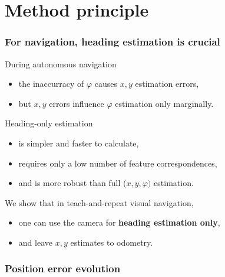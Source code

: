 \section{Method principle}
\begin{frame}
   \frametitle{For navigation, heading estimation is crucial}

   During autonomous navigation
   \begin{itemize}
	\item the inaccurracy of $\varphi$ causes $x,y$ estimation errors, 
	\item but $x,y$ errors influence $\varphi$ estimation only marginally.
   \end{itemize}
   \vspace{5mm}
   Heading-only estimation
    \begin{itemize}
	\item is simpler and faster to calculate,
	\item requires only a low number of feature correspondences,
 	\item and is more robust than full ($x,y,\varphi)$ estimation.
   \end{itemize}
   \vspace{5mm}
  We show that in teach-and-repeat visual navigation,
    \begin{itemize}
	\item one can use the camera for \textbf{heading estimation only}, 
	\item and leave $x,y$ estimates to odometry. 
   \end{itemize}
\end{frame}

\begin{frame}
\frametitle{Position error evolution}
\end{frame}

